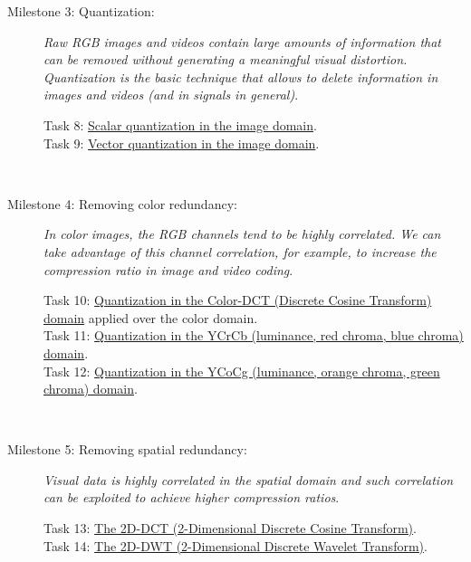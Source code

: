 \begin{description}
\item [Milestone 3: {\normalfont Quantization:}] \emph{Raw RGB images
and videos contain large amounts of information that can be removed
without generating a meaningful visual distortion. Quantization is the
basic technique that allows to delete information in images and videos
(and in signals in general)}.
  \begin{description}
  \item [Task 8: {\normalfont
      \href{https://sistemas-multimedia.github.io/contents/scalar_quantization/}{Scalar quantization
        in the image domain}.}]
  \item [Task 9: {\normalfont
      \href{https://sistemas-multimedia.github.io/contents/vector_quantization/}{Vector
        quantization in the image domain}.}]
  \end{description}
  ~\newline

 \item [Milestone 4: {\normalfont Removing color redundancy:}]
   \emph{In color images, the RGB channels tend to be highly
   correlated. We can take advantage of this channel correlation, for
   example, to increase the compression ratio in image and video
   coding}.
  \begin{description}
  \item [Task 10: {\normalfont
      \href{htpps://sistemas-multimedia.github.io/contents/color_DCT/}{Quantization in the
        Color-DCT (Discrete Cosine Transform) domain}
      applied over the color domain.}]
  \item [Task 11: {\normalfont
      \href{htpps://sistemas-multimedia.github.io/contents/YCrCb/}{Quantization in the
        YCrCb (luminance, red chroma, blue chroma) domain}.}]
  \item [Task 12: {\normalfont
      \href{htpps://sistemas-multimedia.github.io/contents/YCoCg/}{Quantization in the 
        YCoCg (luminance, orange chroma, green chroma) domain}.}]
  \end{description}
  ~\newline

\item [Milestone 5: {\normalfont Removing spatial redundancy:}]
  \emph{Visual data is highly correlated in the spatial domain and
  such correlation can be exploited to achieve higher compression
  ratios}.
  \begin{description}
  \item [Task 13: {\normalfont
      \href{https://sistemas-multimedia.github.io/contents/spatialDCT/}{The
        2D-DCT (2-Dimensional Discrete Cosine Transform)}.}]
  \item [Task 14: {\normalfont
      \href{https://sistemas-multimedia.github.io/contents/DWT/}{The
        2D-DWT (2-Dimensional Discrete Wavelet Transform)}.}]
  \end{description}
  ~\newline


\end{description}
